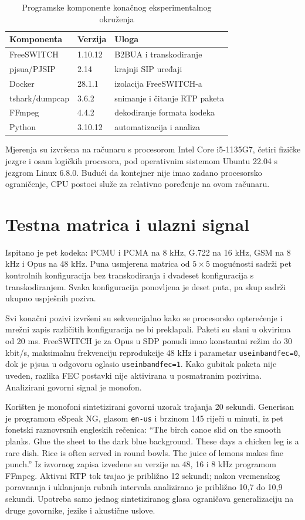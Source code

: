 \begin{table}[htbp]
\centering
\caption{Programske komponente konačnog eksperimentalnog okruženja}
\label{tab:software}
\begin{tabular}{|l|l|l|}
\hline
\textbf{Komponenta} & \textbf{Verzija} & \textbf{Uloga} \\
\hline
FreeSWITCH & 1.10.12 & B2BUA i transkodiranje \\
pjsua/PJSIP & 2.14 & krajnji SIP uređaji \\
Docker & 28.1.1 & izolacija FreeSWITCH-a \\
tshark/dumpcap & 3.6.2 & snimanje i čitanje RTP paketa \\
FFmpeg & 4.4.2 & dekodiranje formata kodeka \\
Python & 3.10.12 & automatizacija i analiza \\
\hline
\end{tabular}
\end{table}

Mjerenja su izvršena na računaru s procesorom Intel Core i5-1135G7, četiri fizičke jezgre i osam logičkih procesora, pod operativnim sistemom Ubuntu 22.04 s jezgrom Linux 6.8.0. Budući da kontejner nije imao zadano procesorsko ograničenje, CPU postoci služe za relativno poređenje na ovom računaru.

\section{Testna matrica i ulazni signal}

Ispitano je pet kodeka: PCMU i PCMA na 8 kHz, G.722 na 16 kHz, GSM na 8 kHz i Opus na 48 kHz. Puna usmjerena matrica od $5\times5$ mogućnosti sadrži pet kontrolnih konfiguracija bez transkodiranja i dvadeset konfiguracija s transkodiranjem. Svaka konfiguracija ponovljena je deset puta, pa skup sadrži ukupno \BrojPoziva{} uspješnih poziva.

Svi konačni pozivi izvršeni su sekvencijalno kako se procesorsko opterećenje i mrežni zapis različitih konfiguracija ne bi preklapali. Paketi su slani u okvirima od 20 ms. FreeSWITCH je za Opus u SDP ponudi imao konstantni režim do 30 kbit/s, maksimalnu frekvenciju reprodukcije 48 kHz i parametar \texttt{useinbandfec=0}, dok je pjsua u odgovoru oglasio \texttt{useinbandfec=1}. Kako gubitak paketa nije uveden, razlika FEC postavki nije aktivirana u posmatranim pozivima. Analizirani govorni signal je monofon.

Korišten je monofoni sintetizirani govorni uzorak trajanja 20 sekundi. Generisan je programom eSpeak NG, glasom \texttt{en-us} i brzinom 145 riječi u minuti, iz pet fonetski raznovrsnih engleskih rečenica: ``The birch canoe slid on the smooth planks. Glue the sheet to the dark blue background. These days a chicken leg is a rare dish. Rice is often served in round bowls. The juice of lemons makes fine punch.'' Iz izvornog zapisa izvedene su verzije na 48, 16 i 8 kHz programom FFmpeg. Aktivni RTP tok trajao je približno 12 sekundi; nakon vremenskog poravnanja i uklanjanja rubnih intervala analizirano je približno 10,7 do 10,9 sekundi. Upotreba samo jednog sintetiziranog glasa ograničava generalizaciju na druge govornike, jezike i akustične uslove.


